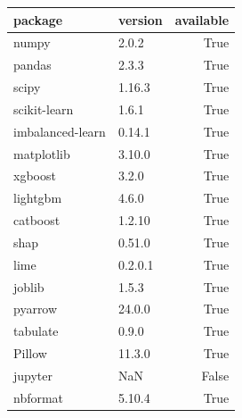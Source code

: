 \begin{tabular}{llr}
\toprule
package & version & available \\
\midrule
numpy & 2.0.2 & True \\
pandas & 2.3.3 & True \\
scipy & 1.16.3 & True \\
scikit-learn & 1.6.1 & True \\
imbalanced-learn & 0.14.1 & True \\
matplotlib & 3.10.0 & True \\
xgboost & 3.2.0 & True \\
lightgbm & 4.6.0 & True \\
catboost & 1.2.10 & True \\
shap & 0.51.0 & True \\
lime & 0.2.0.1 & True \\
joblib & 1.5.3 & True \\
pyarrow & 24.0.0 & True \\
tabulate & 0.9.0 & True \\
Pillow & 11.3.0 & True \\
jupyter & NaN & False \\
nbformat & 5.10.4 & True \\
\bottomrule
\end{tabular}
